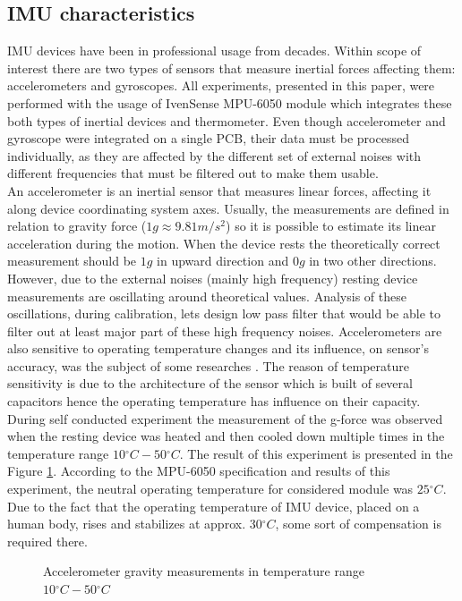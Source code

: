 \documentclass[sensors,article,submit,moreauthors,pdftex,10pt,a4paper]{mdpi}
\newcommand{\degree}{\ensuremath{{}^{\circ}}\xspace}
\begin{document}
\subsection{IMU characteristics}
IMU devices have been in professional usage from decades. Within scope of interest there are two types of sensors that measure inertial forces affecting them: accelerometers and gyroscopes. All experiments, presented in this paper, were performed with the usage of IvenSense MPU-6050 module which integrates these both types of inertial devices and thermometer. Even though accelerometer and gyroscope were integrated on a single PCB, their data must be processed individually, as they are affected by the different set of external noises with different frequencies that must be filtered out to make them usable.\\
An accelerometer is an inertial sensor that measures linear forces, affecting it along device coordinating system axes. Usually, the measurements are defined in relation to gravity force ($1g \approx 9.81  m/{s^2}$) so it is possible to estimate its linear acceleration during the motion. When the device rests the theoretically correct measurement should be $1g$ in upward direction and $0g$ in two other directions. However, due to the external noises (mainly high frequency) resting device measurements are oscillating around theoretical values. Analysis of these oscillations, during calibration, lets design low pass filter that would be able to filter out at least major part of these high frequency noises. Accelerometers are also sensitive to operating temperature changes and its influence, on sensor’s accuracy, was the subject of some researches \cite{Schneider2006, Grigorie1996}. The reason of temperature sensitivity is due to the architecture of the sensor which is built of several capacitors hence the operating temperature has influence on their capacity. During self conducted experiment the measurement of the g-force was observed when the resting device was heated and then cooled down multiple times in the temperature range $10\degree C - 50\degree C$. The result of this experiment is presented in the Figure \ref{fig:imu:tmep}.
According to the MPU-6050 specification and results of this experiment, the neutral operating temperature for considered module was $25\degree C$. Due to the fact that the operating temperature of IMU device, placed on a human body, rises and stabilizes at approx. $30 \degree C$, some sort of compensation is required there. 
\begin{figure}[H]
	\centering
			
	\caption{Accelerometer gravity measurements in temperature range $10\degree C - 50\degree C$}
	\label{fig:imu:tmep}
\end{figure}
\end{document}
